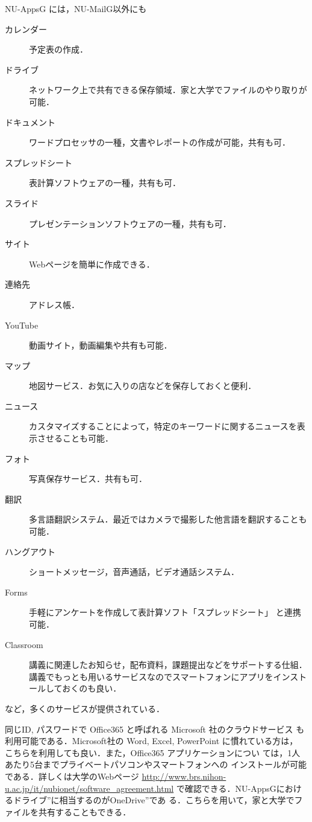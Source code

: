\documentclass[a4j]{ltjsarticle}
\begin{document}
NU-AppsG には，NU-MailG以外にも
\begin{description}
 \item[カレンダー] 予定表の作成．
 \item[ドライブ] ネットワーク上で共有できる保存領域．家と大学でファイルのやり取りが可能．
 \item[ドキュメント] ワードプロセッサの一種，文書やレポートの作成が可能，共有も可．
 \item[スプレッドシート] 表計算ソフトウェアの一種，共有も可．
 \item[スライド] プレゼンテーションソフトウェアの一種，共有も可．
 \item[サイト] Webページを簡単に作成できる．
 \item[連絡先] アドレス帳．
 \item[YouTube] 動画サイト，動画編集や共有も可能．
 \item[マップ] 地図サービス．お気に入りの店などを保存しておくと便利．
 \item[ニュース] カスタマイズすることによって，特定のキーワードに関するニュースを表示させることも可能．
 \item[フォト] 写真保存サービス．共有も可．
 \item[翻訳] 多言語翻訳システム．最近ではカメラで撮影した他言語を翻訳することも可能．
 \item[ハングアウト] ショートメッセージ，音声通話，ビデオ通話システム．
 \item[Forms] 手軽にアンケートを作成して表計算ソフト「スプレッドシート」
	    と連携可能．
 \item[Classroom] 講義に関連したお知らせ，配布資料，課題提出などをサポートする仕組．講義でもっとも用いるサービスなのでスマートフォンにアプリをインストールしておくのも良い．
 \end{description}
など，多くのサービスが提供されている．

同じID, パスワードで Office365 と呼ばれる Microsoft 社のクラウドサービス
も利用可能である．Microsoft社の Word, Excel, PowerPoint に慣れている方は，
こちらを利用しても良い．また，Office365 アプリケーションについ
ては，1人あたり5台までプライベートパソコンやスマートフォンへの
インストールが可能である．詳しくは大学のWebページ
\url{http://www.brs.nihon-u.ac.jp/it/nubionet/software_agreement.html}
で確認できる．NU-AppsGにおけるドライブ''に相当するのがOneDrive''であ
る．こちらを用いて，家と大学でファイルを共有することもできる．
\end{document}
